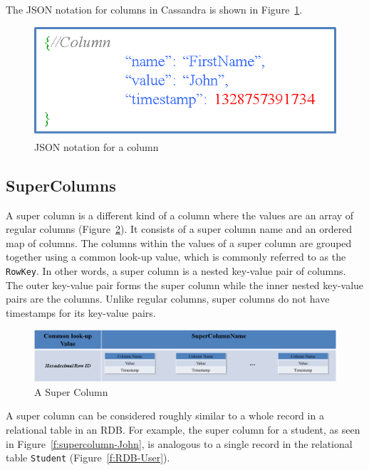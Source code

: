 The JSON notation for  columns in Cassandra is shown in Figure~\ref{f:column-JSON}. 

\begin{figure}[H]
	\centering
	\includegraphics[width=.5\textwidth]{./figure/Example/Column_JSON.png}
	\caption{JSON notation for a column}\label{f:column-JSON}
\end{figure}
% 
\subsection{SuperColumns}
A super column is a different kind of a column where the
values are an array of regular columns (Figure~\ref{f:supercolumn}).  It consists of a super
column name and an ordered map of columns.  The columns within the values of a
super column are grouped together using a common look-up value,   which is
commonly referred to as the \texttt{RowKey}.  In other words,   a super column is a
nested key-value pair of columns.  The outer key-value pair forms the super column while the inner
nested key-value pairs are the columns.  Unlike regular columns,   super columns do
not have timestamps for its key-value pairs.  

\begin{figure}[H]
	\centering
	\includegraphics[width=\textwidth]{./figure/Example/SuperColumn.png}
	\caption{A Super Column }\label{f:supercolumn}
\end{figure}

A super column can be considered roughly similar to a whole record in a
relational table in an \ac{RDB}. For example,   the super column for a
student,   as seen in Figure~\ref{f:supercolumn-John},   is analogous to a single
record in the relational table \texttt{Student} (Figure~\ref{f:RDB-User}). 

